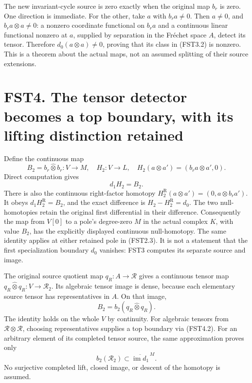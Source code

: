 The new invariant-cycle source is zero exactly when the original map
\(b_r\) is zero. One direction is immediate. For the other, take \(a\)
with \(b_ra\ne0\). Then \(a\ne0\), and \(b_ra\otimes a\ne0\): a nonzero
coordinate functional on \(b_ra\) and a continuous linear functional
nonzero at \(a\), supplied by separation in the Fréchet space \(A\),
detect its tensor. Therefore \(d_0(a\otimes a)\ne0\), proving that its
class in (FST3.2) is nonzero. This is a theorem about the actual maps,
not an assumed splitting of their source extensions.

\section{FST4. The tensor detector becomes a top boundary, with its
lifting distinction
retained}\label{fst4.-the-tensor-detector-becomes-a-top-boundary-with-its-lifting-distinction-retained}

Define the continuous map \[
B_2=b_r\widehat\otimes b_r:V\to M,
\quad H_2:V\to L,
\quad H_2(a\otimes a')=(b_ra\otimes a',0).
\tag{FST4.1}
\] Direct computation gives \[
\boxed{\quad d_1H_2=B_2.\quad}
\tag{FST4.2}
\] There is also the continuous right-factor homotopy
\(H_2^{\mathrm R}(a\otimes a')=(0,a\otimes b_ra')\). It obeys
\(d_1H_2^{\mathrm R}=B_2\), and the exact difference is
\(H_2-H_2^{\mathrm R}=d_0\). The two null-homotopies retain the original
first differential in their difference. Consequently the map from
\(V[0]\) to a pole's degree-zero \(M\) in the actual complex \(K\), with
value \(B_2\), has the explicitly displayed continuous null-homotopy.
The same identity applies at either retained pole in (FST2.3). It is not
a statement that the first specialization boundary \(d_0\) vanishes:
FST3 computes its separate source and image.

The original source quotient map \(q_R:A\to\mathcal R\) gives a
continuous tensor map \(q_R\widehat\otimes q_R:V\to\mathscr R_2\). Its
algebraic tensor image is dense, because each elementary source tensor
has representatives in \(A\). On that image, \[
B_2=b_2(q_R\widehat\otimes q_R).
\tag{FST4.3}
\] The identity holds on the whole \(V\) by continuity. For algebraic
tensors from \(\mathcal R\otimes\mathcal R\), choosing representatives
supplies a top boundary via (FST4.2). For an arbitrary element of its
completed tensor source, the same approximation proves only \[
b_2(\mathscr R_2)\subset\overline{\operatorname{im}d_1}^{\,M}.
\tag{FST4.4}
\] No surjective completed lift, closed image, or descent of the
homotopy is assumed.

